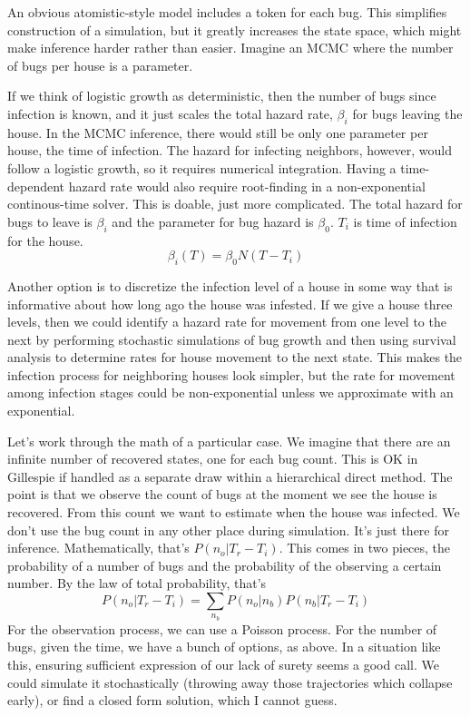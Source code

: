 \documentclass{article}
\begin{document}
An obvious atomistic-style model includes a token for each bug.
This simplifies construction of a simulation, but it greatly
increases the state space, which might make inference harder
rather than easier. Imagine an MCMC where the number of bugs
per house is a parameter.

If we think of logistic growth as deterministic, then the number
of bugs since infection is known, and it just scales the total
hazard rate, $\beta_i$ for bugs leaving the house. In the MCMC inference,
there would still be only one parameter per house, the time
of infection. The hazard for infecting neighbors, however,
would follow a logistic growth, so it requires numerical integration.
Having a time-dependent hazard rate would also require root-finding
in a non-exponential continous-time solver. This is doable, just
more complicated. The total hazard for bugs to leave is $\beta_i$
and the parameter for bug hazard is $\beta_0$. $T_i$ is time of
infection for the house.
\begin{equation}
  \beta_i(T)=\beta_0N(T-T_i)
\end{equation}

Another option is to discretize the infection level of a house in 
some way that is informative about how long ago the house
was infested. If we give a house three levels, then we could 
identify a hazard rate for movement from one level to the next
by performing stochastic simulations of bug growth and then using
survival analysis to determine rates for house movement to the
next state. This makes the infection process for neighboring
houses look simpler, but the rate for movement among infection
stages could be non-exponential unless we approximate with an exponential.

Let's work through the math of a particular case. We imagine that
there are an infinite number of recovered states, one for each bug count.
This is OK in Gillespie if handled as a separate draw within a
hierarchical direct method. The point is that we observe the count of bugs
at the moment we see the house is recovered. From this count we want
to estimate when the house was infected. We don't use the bug count
in any other place during simulation. It's just there for inference.
Mathematically, that's $P(n_o | T_r-T_i)$. This comes in two pieces,
the probability of a number of bugs and the probability of the observing
a certain number. By the law of total probability, that's
\begin{equation}
  P(n_o|T_r-T_i)=\sum_{n_b}P(n_o|n_b)P(n_b|T_r-T_i)
\end{equation}
For the observation process, we can use a Poisson process.
For the number of bugs, given the time, we have a bunch of
options, as above. In a situation like this, ensuring 
sufficient expression of our lack of surety seems a good call.
We could simulate it stochastically (throwing away those trajectories
which collapse early), or find a closed form solution, which I cannot
guess.
\end{document}
